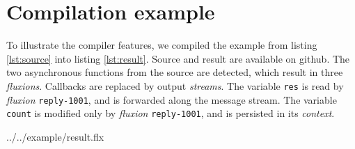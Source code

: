 
\section{Compilation example} \label{section:example}

To illustrate the compiler features, we compiled the example from listing \ref{lst:source} into listing \ref{lst:result}.
Source and result are available on github\cite{flx-example}.
The two asynchronous functions from the source are detected, which result in three \textit{fluxions}.
Callbacks are replaced by output \textit{streams}.
The variable \texttt{res} is read by \textit{fluxion} \texttt{reply-1001}, and is forwarded along the message stream.
The variable \texttt{count} is modified only by \textit{fluxion} \texttt{reply-1001}, and is persisted in its \textit{context}.

{../../example/result.flx}

\vfill\eject
